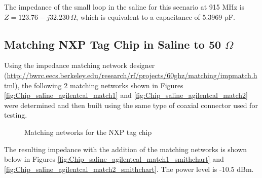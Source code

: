 \documentclass[12pt,onecolumn,titlepage]{article}
\begin{document}
The impedance of the small loop in the saline for this scenario at 915 MHz is $Z=123.76 - j32.230 \, \Omega$, which is equivalent to a capacitance of 5.3969 pF.


\subsection{Matching NXP Tag Chip in Saline to 50 $\Omega$}
\indent \indent Using the impedance matching network designer (\url{http://bwrc.eecs.berkeley.edu/research/rf/projects/60ghz/matching/impmatch.html}), the following 2 matching networks shown in Figures \ref{fig:Chip_saline_agilentcal_match1} and \ref{fig:Chip_saline_agilentcal_match2} were determined and then built using the same type of coaxial connector used for testing. 

\begin{figure}[h!]
	\centering
	\label{fig:Chip_saline_agilentcal_match}
	\caption{Matching networks for the NXP tag chip}
\end{figure}


The resulting impedance with the addition of the matching networks is shown below in Figures \ref{fig:Chip_saline_agilentcal_match1_smithchart} and \ref{fig:Chip_saline_agilentcal_match2_smithchart}. The power level is -10.5 dBm.
\end{document}
